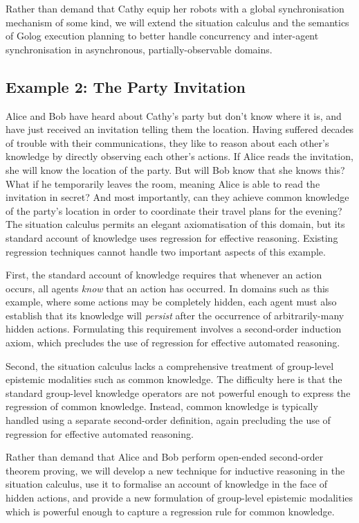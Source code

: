 Rather than demand that Cathy equip her robots with a global synchronisation
mechanism of some kind, we will extend the situation calculus and
the semantics of Golog execution planning to better handle concurrency
and inter-agent synchronisation in asynchronous, partially-observable
domains.


\subsection*{Example 2: The Party Invitation}

Alice and Bob have heard about Cathy's party but don't know where
it is, and have just received an invitation telling them the location.
Having suffered decades of trouble with their communications, they
like to reason about each other's knowledge by directly observing
each other's actions. If Alice reads the invitation, she will know
the location of the party. But will Bob know that she knows this?
What if he temporarily leaves the room, meaning Alice is able to read
the invitation in secret? And most importantly, can they achieve common
knowledge of the party's location in order to coordinate their travel
plans for the evening?\\


The situation calculus permits an elegant axiomatisation of this domain,
but its standard account of knowledge uses regression for effective
reasoning. Existing regression techniques cannot handle two important
aspects of this example.

First, the standard account of knowledge requires that whenever an
action occurs, all agents \emph{know} that an action has occurred.
In domains such as this example, where some actions may be completely
hidden, each agent must also establish that its knowledge will \emph{persist}
after the occurrence of arbitrarily-many hidden actions. Formulating
this requirement involves a second-order induction axiom, which precludes
the use of regression for effective automated reasoning.

Second, the situation calculus lacks a comprehensive treatment of
group-level epistemic modalities such as common knowledge. The difficulty
here is that the standard group-level knowledge operators are not
powerful enough to express the regression of common knowledge. Instead,
common knowledge is typically handled using a separate second-order
definition, again precluding the use of regression for effective automated
reasoning.

Rather than demand that Alice and Bob perform open-ended second-order
theorem proving, we will develop a new technique for inductive reasoning
in the situation calculus, use it to formalise an account of knowledge
in the face of hidden actions, and provide a new formulation of group-level
epistemic modalities which is powerful enough to capture a regression
rule for common knowledge.


